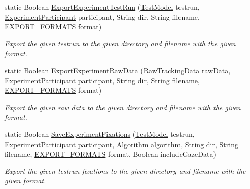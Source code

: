 \begin{DoxyCompactItemize}
static Boolean \hyperlink{class_web_analyzer_1_1_controller_1_1_export_controller_a9f312de4f46d4bfb9c33b4f7ce79e79d}{Export\+Experiment\+Test\+Run} (\hyperlink{class_web_analyzer_1_1_models_1_1_data_model_1_1_test_model}{Test\+Model} testrun, \hyperlink{class_web_analyzer_1_1_models_1_1_base_1_1_experiment_participant}{Experiment\+Participant} participant, String dir, String filename, \hyperlink{class_web_analyzer_1_1_controller_1_1_export_controller_a8cea4a311ecaf495f305f9d7829a57aa}{E\+X\+P\+O\+R\+T\+\_\+\+F\+O\+R\+M\+A\+T\+S} format)
\begin{DoxyCompactList}\small\item\em Export the given testrun to the given directory and filename with the given format. \end{DoxyCompactList}\item 
static Boolean \hyperlink{class_web_analyzer_1_1_controller_1_1_export_controller_a67bc9f73d2b99277aa598fd6857ba3d4}{Export\+Experiment\+Raw\+Data} (\hyperlink{class_web_analyzer_1_1_models_1_1_base_1_1_raw_tracking_data}{Raw\+Tracking\+Data} raw\+Data, \hyperlink{class_web_analyzer_1_1_models_1_1_base_1_1_experiment_participant}{Experiment\+Participant} participant, String dir, String filename, \hyperlink{class_web_analyzer_1_1_controller_1_1_export_controller_a8cea4a311ecaf495f305f9d7829a57aa}{E\+X\+P\+O\+R\+T\+\_\+\+F\+O\+R\+M\+A\+T\+S} format)
\begin{DoxyCompactList}\small\item\em Export the given raw data to the given directory and filename with the given format. \end{DoxyCompactList}\item 
static Boolean \hyperlink{class_web_analyzer_1_1_controller_1_1_export_controller_a950bdbe0fb6f3de2f86617f0aeb34602}{Save\+Experiment\+Fixations} (\hyperlink{class_web_analyzer_1_1_models_1_1_data_model_1_1_test_model}{Test\+Model} testrun, \hyperlink{class_web_analyzer_1_1_models_1_1_base_1_1_experiment_participant}{Experiment\+Participant} participant, \hyperlink{class_web_analyzer_1_1_models_1_1_algorithm_model_1_1_algorithm}{Algorithm} \hyperlink{_u_i_2_h_t_m_l_resources_2js_2src_2analyse_8js_a1222cf9678e9ad6a699b071d3308f976}{algorithm}, String dir, String filename, \hyperlink{class_web_analyzer_1_1_controller_1_1_export_controller_a8cea4a311ecaf495f305f9d7829a57aa}{E\+X\+P\+O\+R\+T\+\_\+\+F\+O\+R\+M\+A\+T\+S} format, Boolean include\+Gaze\+Data)
\begin{DoxyCompactList}\small\item\em Export the given testrun fixations to the given directory and filename with the given format. \end{DoxyCompactList}\item 

\end{DoxyCompactItemize}
